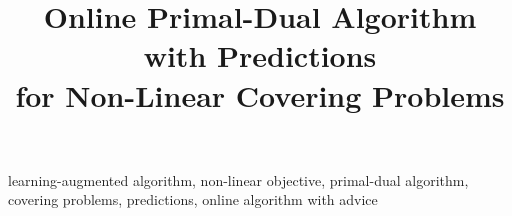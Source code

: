 \documentclass[anon,12pt]{alt2025} %
\title[Online Non-Linear Covering]{Online Primal-Dual Algorithm with Predictions\\ for Non-Linear Covering Problems}
\begin{document}
\maketitle



\begin{keywords}%
    learning-augmented algorithm, non-linear objective, primal-dual algorithm, covering problems, predictions, online algorithm with advice
\end{keywords}







\clearpage



\clearpage

\appendix


\clearpage

\end{document}
